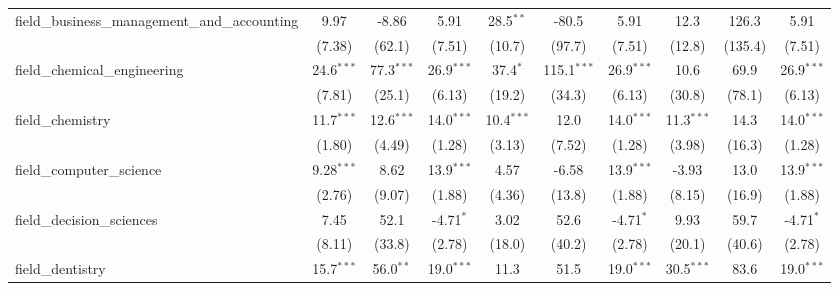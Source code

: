 \begin{tabular}{lccccccccc}
   field\_business\_management\_and\_accounting                & 9.97          & -8.86         & 5.91          & 28.5$^{**}$   & -80.5          & 5.91          & 12.3          & 126.3          & 5.91\\   
                                                               & (7.38)        & (62.1)        & (7.51)        & (10.7)        & (97.7)         & (7.51)        & (12.8)        & (135.4)        & (7.51)\\   
   field\_chemical\_engineering                                & 24.6$^{***}$  & 77.3$^{***}$  & 26.9$^{***}$  & 37.4$^{*}$    & 115.1$^{***}$  & 26.9$^{***}$  & 10.6          & 69.9           & 26.9$^{***}$\\   
                                                               & (7.81)        & (25.1)        & (6.13)        & (19.2)        & (34.3)         & (6.13)        & (30.8)        & (78.1)         & (6.13)\\   
   field\_chemistry                                            & 11.7$^{***}$  & 12.6$^{***}$  & 14.0$^{***}$  & 10.4$^{***}$  & 12.0           & 14.0$^{***}$  & 11.3$^{***}$  & 14.3           & 14.0$^{***}$\\   
                                                               & (1.80)        & (4.49)        & (1.28)        & (3.13)        & (7.52)         & (1.28)        & (3.98)        & (16.3)         & (1.28)\\   
   field\_computer\_science                                    & 9.28$^{***}$  & 8.62          & 13.9$^{***}$  & 4.57          & -6.58          & 13.9$^{***}$  & -3.93         & 13.0           & 13.9$^{***}$\\   
                                                               & (2.76)        & (9.07)        & (1.88)        & (4.36)        & (13.8)         & (1.88)        & (8.15)        & (16.9)         & (1.88)\\   
   field\_decision\_sciences                                   & 7.45          & 52.1          & -4.71$^{*}$   & 3.02          & 52.6           & -4.71$^{*}$   & 9.93          & 59.7           & -4.71$^{*}$\\   
                                                               & (8.11)        & (33.8)        & (2.78)        & (18.0)        & (40.2)         & (2.78)        & (20.1)        & (40.6)         & (2.78)\\   
   field\_dentistry                                            & 15.7$^{***}$  & 56.0$^{**}$   & 19.0$^{***}$  & 11.3          & 51.5           & 19.0$^{***}$  & 30.5$^{***}$  & 83.6           & 19.0$^{***}$\\   

\end{tabular}
